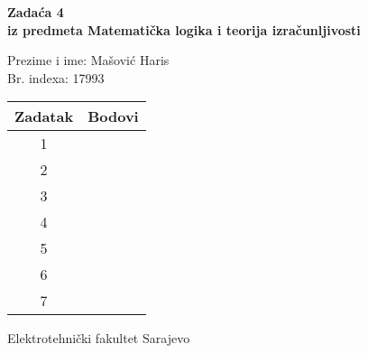 \documentclass[12pt]{article}
\newcommand{\prezimeIme}{Mašović Haris}
\newcommand{\brIndexa}{17993}
\newcommand{\brZadace}{4}
\begin{document}
    
    \thispagestyle{empty}
    \begin{center}
      \vspace*{1cm}

      \vspace*{2cm}
      {\huge \bf Zadaća \brZadace } \\
      \vspace*{1cm}
      {\Large \bf iz predmeta Matematička logika i teorija izračunljivosti}

      \vspace*{2cm}

      {\Large Prezime i ime: \prezimeIme} \\
      \vspace*{0.75cm}
      {\Large Br. indexa: \brIndexa}

      \vspace*{3cm}
      \renewcommand{\arraystretch}{1.75}
      \begin{tabular}{|c|c|}
    	\hline Zadatak & Bodovi \\
    	\hline 1 &  \\
    	\hline 2 &  \\
    	\hline 3 &  \\
    	\hline 4 &  \\
    	\hline 5 &  \\
    	\hline 6 &  \\
    	\hline 7 &  \\
    	\hline 
     \end{tabular}

      \vfill


      {\large Elektrotehnički fakultet Sarajevo}

    \end{center}
    \newpage
    \thispagestyle{empty}
    
\end{document}
